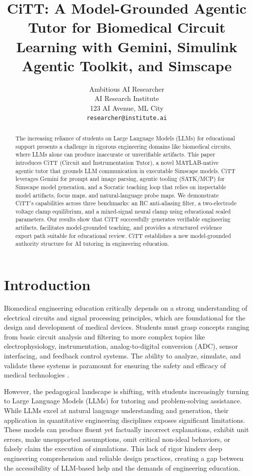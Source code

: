 \documentclass[10pt,twocolumn,letterpaper]{article}
\title{CiTT: A Model-Grounded Agentic Tutor for Biomedical Circuit Learning with Gemini, Simulink Agentic Toolkit, and Simscape}
\author{Ambitious AI Researcher\\
AI Research Institute\\
123 AI Avenue, ML City\\
{\tt\small researcher@institute.ai}
}
\begin{document}
\maketitle

\begin{abstract}
The increasing reliance of students on Large Language Models (LLMs) for educational support presents a challenge in rigorous engineering domains like biomedical circuits, where LLMs alone can produce inaccurate or unverifiable artifacts. This paper introduces CiTT (Circuit and Instrumentation Tutor), a novel MATLAB-native agentic tutor that grounds LLM communication in executable Simscape models. CiTT leverages Gemini for prompt and image parsing, agentic tooling (SATK/MCP) for Simscape model generation, and a Socratic teaching loop that relies on inspectable model artifacts, focus maps, and natural-language probe maps. We demonstrate CiTT's capabilities across three benchmarks: an RC anti-aliasing filter, a two-electrode voltage clamp equilibrium, and a mixed-signal neural clamp using educational scaled parameters. Our results show that CiTT successfully generates verifiable engineering artifacts, facilitates model-grounded teaching, and provides a structured evidence export path suitable for educational review. CiTT establishes a new model-grounded authority structure for AI tutoring in engineering education.
\end{abstract}

\section{Introduction}
\label{sec:intro}
Biomedical engineering education critically depends on a strong understanding of electrical circuits and signal processing principles, which are foundational for the design and development of medical devices. Students must grasp concepts ranging from basic circuit analysis and filtering to more complex topics like electrophysiology, instrumentation, analog-to-digital conversion (ADC), sensor interfacing, and feedback control systems. The ability to analyze, simulate, and validate these systems is paramount for ensuring the safety and efficacy of medical technologies \cite{webster_medical_instrumentation_2020}.

However, the pedagogical landscape is shifting, with students increasingly turning to Large Language Models (LLMs) for tutoring and problem-solving assistance. While LLMs excel at natural language understanding and generation, their application in quantitative engineering disciplines exposes significant limitations. These models can produce fluent yet factually incorrect explanations, exhibit unit errors, make unsupported assumptions, omit critical non-ideal behaviors, or falsely claim the execution of simulations. This lack of rigor hinders deep engineering comprehension and reliable design practices, creating a gap between the accessibility of LLM-based help and the demands of engineering education.
\end{document}
